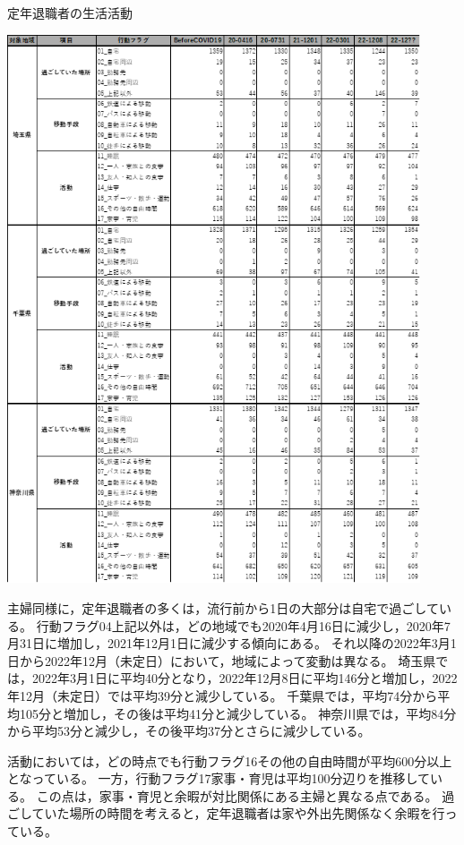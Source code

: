 \documentclass[paper={210mm,297mm},fontsize=15Q,line_length=35zw,number_of_lines=31,head_space=30mm,gutter=40mm,baselineskip=2.0zw,headfoot_verticalposition=1.5zw]{jlreq}
\begin{document}
\begin{table}[H]
  \centering
  \caption{定年退職者の生活活動}
  \includegraphics[width=122mm]{../Figure/c04s06_table_定年退職者_生活活動.png}
  \label{生活活動_定年退職者}
\end{table}

主婦同様に，定年退職者の多くは，流行前から1日の大部分は自宅で過ごしている。
行動フラグ04上記以外は，どの地域でも2020年4月16日に減少し，2020年7月31日に増加し，2021年12月1日に減少する傾向にある。
それ以降の2022年3月1日から2022年12月（未定日）において，地域によって変動は異なる。
埼玉県では，2022年3月1日に平均40分となり，2022年12月8日に平均146分と増加し，2022年12月（未定日）では平均39分と減少している。
千葉県では，平均74分から平均105分と増加し，その後は平均41分と減少している。
神奈川県では，平均84分から平均53分と減少し，その後平均37分とさらに減少している。

活動においては，どの時点でも行動フラグ16その他の自由時間が平均600分以上となっている。
一方，行動フラグ17家事・育児は平均100分辺りを推移している。
この点は，家事・育児と余暇が対比関係にある主婦と異なる点である。
過ごしていた場所の時間を考えると，定年退職者は家や外出先関係なく余暇を行っている。
\end{document}
